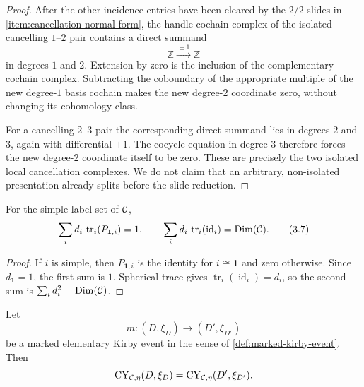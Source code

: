 \begin{proof}
After the other incidence entries have been cleared by the $2/2$ slides in
\cref{item:cancellation-normal-form}, the handle cochain complex of the
isolated cancelling $1$--$2$ pair contains a direct
summand
\[
  \mathbb Z\xrightarrow{\,\pm1\,}\mathbb Z
\]
in degrees $1$ and $2$.  Extension by zero is the inclusion of the
complementary cochain complex.  Subtracting the coboundary of the appropriate
multiple of the new degree-$1$ basis cochain makes the new degree-$2$
coordinate zero, without changing its cohomology class.

For a cancelling $2$--$3$ pair the corresponding direct summand lies in
degrees $2$ and $3$, again with differential $\pm1$.  The cocycle equation
in degree $3$ therefore forces the new degree-$2$ coordinate itself to be
zero.  These are precisely the two isolated local cancellation complexes.
We do not claim that an arbitrary, non-isolated presentation already splits
before the slide reduction.
\end{proof}

\begin{lemma}
\label{lem:local-cancellation-sums}
For the simple-label set of $\mathcal{C}$,
\[
  \sum_i d_i\,\operatorname{tr}_i(P_{\mathbf1,i})=1,
  \qquad
  \sum_i d_i\,\operatorname{tr}_i(\operatorname{id}_i)
  =\operatorname{Dim}(\mathcal{C}).                  \tag{3.7}\label{eq:local-cancellation-sums}
\]
\end{lemma}

\begin{proof}
If $i$ is simple, then $P_{\mathbf1,i}$ is the identity for
$i\cong\mathbf1$ and zero otherwise.  Since $d_{\mathbf1}=1$, the first sum
is $1$.  Spherical trace gives
$\operatorname{tr}_i(\operatorname{id}_i)=d_i$, so the second sum is
$\sum_i d_i^2=\operatorname{Dim}(\mathcal{C})$.
\end{proof}

\begin{theorem}
\label{thm:elementary-kirby-invariance}
Let
\[
  m\colon(D,\xi_D)\longrightarrow(D',\xi_{D'})
\]
be a marked elementary Kirby event in the sense of
\cref{def:marked-kirby-event}.  Then
\[
  \operatorname{CY}_{\mathcal{C},\eta}(D,\xi_D)
  =\operatorname{CY}_{\mathcal{C},\eta}(D',\xi_{D'}).
\]
\end{theorem}


